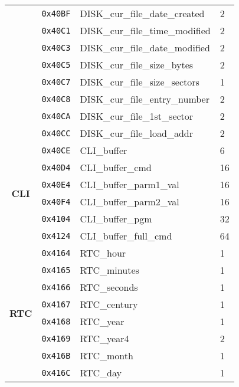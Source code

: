 \documentclass[a4paper,11pt]{article}
\begin{document}
\begin{longtable}{ |l|l|l|l|l| }
        \multicolumn{2}{|c|}{} & \texttt{0x40BF} & DISK\_cur\_file\_date\_created & 2\\
        \multicolumn{2}{|c|}{} & \texttt{0x40C1} & DISK\_cur\_file\_time\_modified & 2\\
        \multicolumn{2}{|c|}{} & \texttt{0x40C3} & DISK\_cur\_file\_date\_modified & 2\\
        \multicolumn{2}{|c|}{} & \texttt{0x40C5} & DISK\_cur\_file\_size\_bytes & 2\\
        \multicolumn{2}{|c|}{} & \texttt{0x40C7} & DISK\_cur\_file\_size\_sectors & 1\\
        \multicolumn{2}{|c|}{} & \texttt{0x40C8} & DISK\_cur\_file\_entry\_number & 2\\
        \multicolumn{2}{|c|}{} & \texttt{0x40CA} & DISK\_cur\_file\_1st\_sector & 2\\
        \multicolumn{2}{|c|}{} & \texttt{0x40CC} & DISK\_cur\_file\_load\_addr & 2\\
        \hline
        \multicolumn{2}{|c|}{\multirow{6}{*}{\textbf{CLI}}} & \texttt{0x40CE} & CLI\_buffer & 6\\
        \multicolumn{2}{|c|}{} & \texttt{0x40D4} & CLI\_buffer\_cmd & 16\\
        \multicolumn{2}{|c|}{} & \texttt{0x40E4} & CLI\_buffer\_parm1\_val & 16\\
        \multicolumn{2}{|c|}{} & \texttt{0x40F4} & CLI\_buffer\_parm2\_val & 16\\
        \multicolumn{2}{|c|}{} & \texttt{0x4104} & CLI\_buffer\_pgm & 32\\
        \multicolumn{2}{|c|}{} & \texttt{0x4124} & CLI\_buffer\_full\_cmd & 64\\
        \hline
        \multicolumn{2}{|c|}{\multirow{9}{*}{\textbf{RTC}}} & \texttt{0x4164} & RTC\_hour & 1\\
        \multicolumn{2}{|c|}{} & \texttt{0x4165} & RTC\_minutes & 1\\
        \multicolumn{2}{|c|}{} & \texttt{0x4166} & RTC\_seconds & 1\\
        \multicolumn{2}{|c|}{} & \texttt{0x4167} & RTC\_century & 1\\
        \multicolumn{2}{|c|}{} & \texttt{0x4168} & RTC\_year & 1\\
        \multicolumn{2}{|c|}{} & \texttt{0x4169} & RTC\_year4 & 2\\
        \multicolumn{2}{|c|}{} & \texttt{0x416B} & RTC\_month & 1\\
        \multicolumn{2}{|c|}{} & \texttt{0x416C} & RTC\_day & 1\\

\end{longtable}
\end{document}
